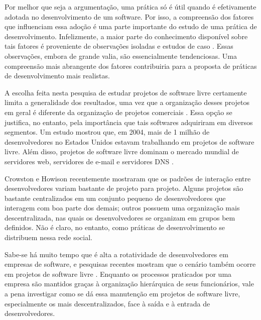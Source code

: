 \documentclass{article}
\begin{document}
Por melhor que seja a argumentação, uma prática só é útil quando é efetivamente
adotada no desenvolvimento de um software. Por isso, a compreensão dos fatores
que influenciam essa adoção é uma parte importante do estudo de uma prática de
desenvolvimento. Infelizmente, a maior parte do conhecimento disponível sobre
tais fatores é proveniente de observações isoladas e estudos de caso
\cite{crowston2005}. Essas observações, embora de grande valia, são
essencialmente tendenciosas. Uma compreensão mais abrangente dos fatores
contribuiria para a proposta de práticas de desenvolvimento mais realistas.

A escolha feita nesta pesquisa de estudar projetos de software livre certamente
limita a generalidade dos resultados, uma vez que a organização desses projetos
em geral é diferente da organização de projetos comerciais \cite{raymond2001}.
Essa opção se justifica, no entanto, pela importância que tais softwares
adquiriram em diversos segmentos.  Um estudo mostrou que, em 2004, mais de 1
milhão de desenvolvedores no Estados Unidos estavam trabalhando em projetos de
software livre. Além disso, projetos de software livre dominam o mercado mundial
de servidores web, servidores de e-mail e servidores DNS \cite{wheeler2007}.

Crowston e Howison \cite{crowston2005} recentemente mostraram que os padrões de
interação entre desenvolvedores variam bastante de projeto para projeto. Alguns
projetos são bastante centralizados em um conjunto pequeno de desenvolvedores
que interagem com boa parte dos demais; outros possuem uma organização mais
descentralizada, nas quais os desenvolvedores se organizam em grupos bem
definidos. Não é claro, no entanto, como práticas de desenvolvimento se
distribuem nessa rede social. 


Sabe-se há muito tempo que é alta a rotatividade de desenvolvedores em empresas
de software, e pesquisas recentes mostram que o cenário também ocorre em
projetos de software livre \cite{robles2006}. Enquanto os processos praticados
por uma empresa são mantidos graças à organização hierárquica de seus
funcionários, vale a pena investigar como se dá essa manutenção em projetos de
software livre, especialmente os mais descentralizados, face à saída e à entrada
de desenvolvedores. 
\end{document}
